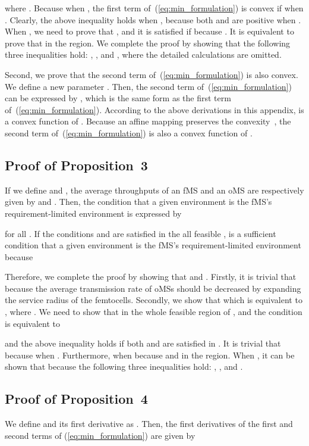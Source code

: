 \documentclass[journal]{IEEEtran}
\begin{document}
where . Because  when ,
the first term of~(\ref{eq:min_formulation}) is convex if  when .
Clearly, the above inequality holds when , because both  and  are positive
when .
When , we need to prove that ,
and it is satisfied if  because . It is equivalent to prove that  in the region.
We complete the proof by showing that the following three inequalities hold:
,
,
and , where the detailed calculations are omitted.

Second, we prove that the second term of~(\ref{eq:min_formulation}) is also convex.
We define a new parameter .
Then, the second term of~(\ref{eq:min_formulation}) can be expressed by , which
is the same form as the first term of~(\ref{eq:min_formulation}).
According to the above derivations in this appendix,  is a convex function of .
Because an affine mapping preserves the convexity~\cite{book04boyd}, the second term of~(\ref{eq:min_formulation})
is also a convex function of .


\subsection{Proof of Proposition~3}
\label{appendix:proof3}

If we define   and
,
the average throughputs of an fMS and an oMS are respectively given by
 and
.
Then, the condition that a given environment is the fMS's requirement-limited environment is expressed by

for all .
If the conditions  and
 are satisfied
in the all feasible ,
 is a sufficient condition that  a given environment is the fMS's requirement-limited environment because



Therefore, we complete the proof by showing that 
and .
Firstly, it is trivial that   because the average transmission
rate of oMSs should be decreased by expanding the service radius of the femtocells.
Secondly, we show that  which is equivalent to
, where .
We need to show that 
in the whole feasible region of , and the condition is equivalent to

and the above inequality holds if both 
and  are satisfied in .
It is trivial that  because
 when  .
Furthermore,  when
 because  and  in the region.
When , it can be shown that 
because the following three inequalities hold:
,
, and
.



\subsection{Proof of Proposition~4}
\label{appendix:proof4}
We define  and
its first derivative as .
Then, the first derivatives of the first and second terms
of (\ref{eq:min_formulation}) are given by
\end{document}
